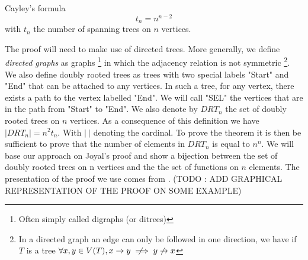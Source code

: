 \begin{theorem}{Cayley's formula}\label{cayley}
\begin{equation}
    t_n = n^{n-2}
\end{equation}
with $t_n$ the number of spanning trees on $n$ vertices.
\end{theorem}
The proof will need to make use of directed trees.
More generally, we define \emph{directed graphs} as graphs \footnote{Often simply called digraphs (or ditrees)} in which the adjacency relation is not symmetric
\footnote{In a directed graph an edge can only be followed in one direction, we have if $T$ is a tree $\forall x,y \in V(T), x\to y \notimplies y \not\to x$}.
We also define doubly rooted trees as trees with two special labels "Start" and "End" that can be attached to any vertices.
In such a tree, for any vertex, there exists a path to the vertex labelled "End".
We will call "SEL" the vertices that are in the path from "Start" to "End". 
We also denote by $DRT_n$ the set of doubly rooted trees on $n$ vertices.
\newline
As a consequence of this definition we have $|DRT_n| = n^2 t_n$. With $|\ |$ denoting the cardinal. 
To prove the theorem it is then be sufficient to prove that the number of elements in $DRT_n$ is equal to $n^n$.
We will base our approach on Joyal's proof \cite{joyal} and show a bijection between the set of doubly rooted trees on n vertices and the the set of functions on $n$ elements.
The presentation of the proof we use comes from \cite{JoyalProof}.
\newline
(TODO : ADD GRAPHICAL REPRESENTATION OF THE PROOF ON SOME EXAMPLE)
